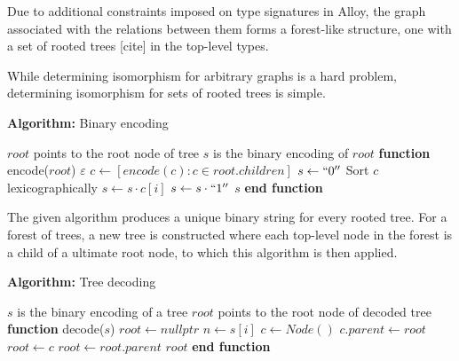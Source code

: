 \documentclass[conference]{IEEEtran}
\begin{document}
    Due to additional constraints imposed on type signatures in Alloy, the graph associated with the relations between them forms a forest-like structure, one with a set of rooted trees [cite]
    in the top-level types.
    
    While determining isomorphism for arbitrary graphs is a hard problem, determining isomorphism for sets of rooted trees is simple.

    \newcommand{\FUNCTION}[2]{\STATE \textbf{function} #1(#2)}
    \newcommand{\ENDFUNCTION}{\STATE \textbf{end function}}

    \begin{center}
        \textbf{Algorithm:} Binary encoding
        \end{center}
        \begin{algorithmic}[1]  %
        \REQUIRE $root$ points to the root node of tree
        \ENSURE $s$ is the binary encoding of $root$
        \FUNCTION{encode}{$root$}
            \RETURN $\varepsilon$
        \ENDIF 
        \STATE $c \gets [encode(c) : c \in root.children]$
        \STATE $s \gets ``0''$
        \STATE Sort $c$ lexicographically
        \STATE $s \gets s \cdot c[i]$
        \ENDFOR
        \STATE $s \gets s \cdot ``1''$
        \RETURN $s$
        \ENDFUNCTION
        \end{algorithmic}

The given algorithm produces a unique binary string for every rooted tree. For a forest of trees, a new tree is constructed where each top-level node in the forest is a child of a ultimate root node, to which this algorithm is then applied.

\begin{center}
    \textbf{Algorithm:} Tree decoding
    \end{center}
    \begin{algorithmic}[1]  %
    \ENSURE $s$ is the binary encoding of a tree
    \REQUIRE $root$ points to the root node of decoded tree
    \FUNCTION{decode}{$s$}
    \STATE $root \gets nullptr$
        \STATE $n \gets s[i]$
        \STATE $c \gets Node()$
        \STATE $c.parent \gets root$
        \STATE $root \gets c$
        \ELSE
        \STATE $root \gets root.parent$
        \ENDIF
    \ENDFOR
    \RETURN $root$
    \ENDFUNCTION
    \end{algorithmic}
\end{document}
